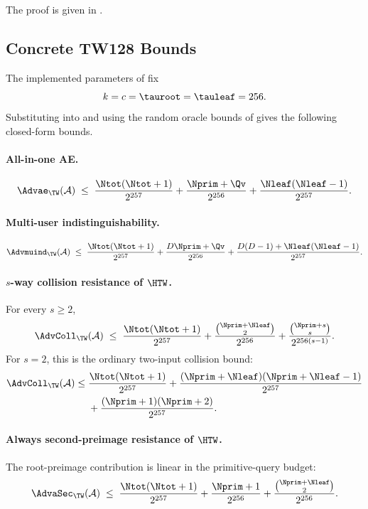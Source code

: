 The proof is given in .

\subsection{Concrete TW128 Bounds}
\label{sec:concrete}

The implemented parameters of  fix
\[
  k = c = \tauroot = \tauleaf = 256.
\]
Substituting into
and using the random oracle bounds of  gives the
following closed-form bounds.

\paragraph{All-in-one AE.}
\[
  \Advae_\TW(\mathcal{A})
  \;\leq\;
  \frac{\Ntot(\Ntot + 1)}{2^{257}}
  + \frac{\Nprim + \Qv}{2^{256}}
  + \frac{\Nleaf(\Nleaf - 1)}{2^{257}}.
\]

\paragraph{Multi-user indistinguishability.}
\[
  \Advmuind_\TW(\mathcal{A})
  \;\leq\;
  \frac{\Ntot(\Ntot + 1)}{2^{257}}
  + \frac{D \Nprim + \Qv}{2^{256}}
  + \frac{D(D - 1) + \Nleaf(\Nleaf - 1)}{2^{257}}.
\]

\paragraph{$s$-way collision resistance of $\HTW$.}
For every $s \geq 2$,
\[
  \AdvColl_\TW(\mathcal{A})
  \;\leq\;
  \frac{\Ntot(\Ntot + 1)}{2^{257}}
  + \frac{\binom{\Nprim+\Nleaf}{2}}{2^{256}}
  + \frac{\binom{\Nprim + s}{s}}{2^{256 (s - 1)}}.
\]
For $s=2$, this is the ordinary two-input collision bound:
\[
\begin{aligned}
  \AdvColl_\TW(\mathcal{A})
\leq\;&
  \frac{\Ntot(\Ntot + 1)}{2^{257}}
  + \frac{(\Nprim+\Nleaf)(\Nprim+\Nleaf-1)}{2^{257}} \\
& + \frac{(\Nprim + 1)(\Nprim + 2)}{2^{257}} .
\end{aligned}
\]

\paragraph{Always second-preimage resistance of $\HTW$.}
The root-preimage contribution is linear in the primitive-query budget:
\[
  \AdvaSec_\TW(\mathcal{A})
  \;\leq\;
  \frac{\Ntot(\Ntot + 1)}{2^{257}}
  + \frac{\Nprim + 1}{2^{256}}
  + \frac{\binom{\Nprim+\Nleaf}{2}}{2^{256}}.
\]

